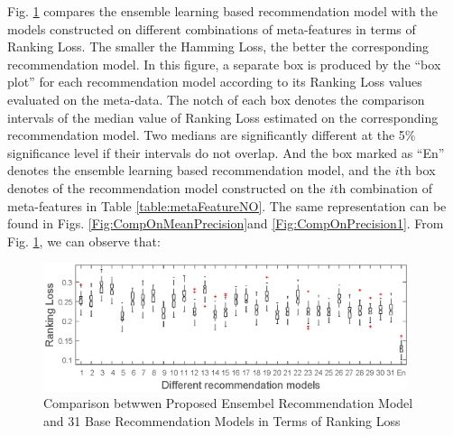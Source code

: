 \documentclass[prodmode,acmtkdd]{acmsmall}
\begin{document}
Fig. \ref{Fig:CompOnHammLoss} compares the ensemble learning based
recommendation model with the models constructed on different
combinations of meta-features in terms of Ranking Loss. The smaller
the Hamming Loss, the better the corresponding recommendation model.
In this figure, a separate box is produced by the ``box plot'' for
each recommendation model according to its Ranking Loss values
evaluated on the meta-data. The notch of each box denotes the
comparison intervals of the median value of Ranking Loss estimated
on the corresponding recommendation model. Two medians are
significantly different at the 5\% significance level if their
intervals do not overlap. And the box marked as ``En'' denotes the
ensemble learning based recommendation model, and the $i$th box
denotes of the recommendation model constructed on the $i$th
combination of meta-features in Table \ref{table:metaFeatureNO}. The
same representation can be found in Figs.
\ref{Fig:CompOnMeanPrecision}and \ref{Fig:CompOnPrecision1}. From
Fig. \ref{Fig:CompOnHammLoss}, we can observe that:

\begin{figure}[!h]
	\centering
	\includegraphics[width=0.95\textwidth]{Figures/RankLossComparison}
	\caption{Comparison betwwen Proposed Ensembel Recommendation Model and 31 Base Recommendation Models in Terms of Ranking Loss}\label{Fig:CompOnHammLoss}
\end{figure}
\end{document}
